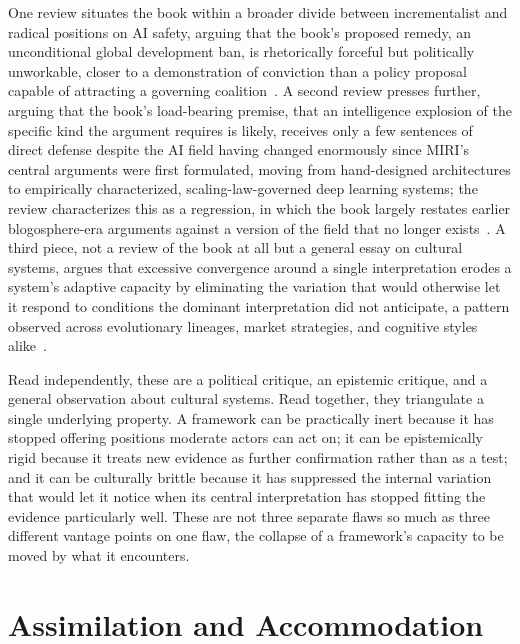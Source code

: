 \documentclass[11pt]{article}
\begin{document}
One review situates the book within a broader divide between incrementalist and radical positions on AI safety, arguing that the book's proposed remedy, an unconditional global development ban, is rhetorically forceful but politically unworkable, closer to a demonstration of conviction than a policy proposal capable of attracting a governing coalition~\cite{alexander2025}. A second review presses further, arguing that the book's load-bearing premise, that an intelligence explosion of the specific kind the argument requires is likely, receives only a few sentences of direct defense despite the AI field having changed enormously since MIRI's central arguments were first formulated, moving from hand-designed architectures to empirically characterized, scaling-law-governed deep learning systems; the review characterizes this as a regression, in which the book largely restates earlier blogosphere-era arguments against a version of the field that no longer exists~\cite{collier2025}. A third piece, not a review of the book at all but a general essay on cultural systems, argues that excessive convergence around a single interpretation erodes a system's adaptive capacity by eliminating the variation that would otherwise let it respond to conditions the dominant interpretation did not anticipate, a pattern observed across evolutionary lineages, market strategies, and cognitive styles alike~\cite{hanson2024}.

Read independently, these are a political critique, an epistemic critique, and a general observation about cultural systems. Read together, they triangulate a single underlying property. A framework can be practically inert because it has stopped offering positions moderate actors can act on; it can be epistemically rigid because it treats new evidence as further confirmation rather than as a test; and it can be culturally brittle because it has suppressed the internal variation that would let it notice when its central interpretation has stopped fitting the evidence particularly well. These are not three separate flaws so much as three different vantage points on one flaw, the collapse of a framework's capacity to be moved by what it encounters.

\section{Assimilation and Accommodation}
\end{document}
